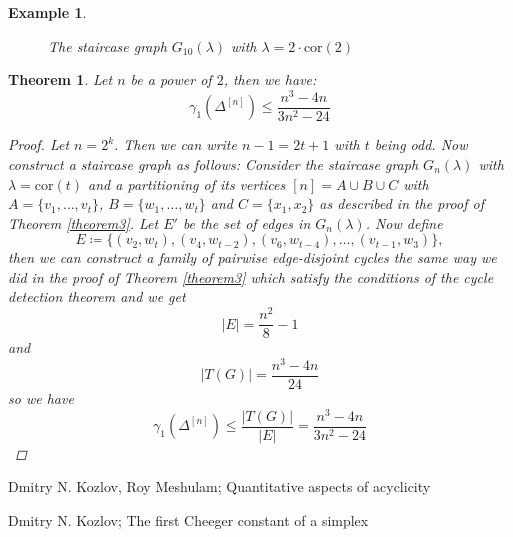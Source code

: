 \documentclass{article}
\newtheorem{thm}{Theorem}[section]
\newtheorem{expl}{Example}[section]
\begin{document}
\begin{expl}
\begin{figure}[ht]
  \caption{The staircase graph $G_{10}(\lambda)$ with $\lambda=2\cdot\text{cor}(2)$}
  \label{figure1:Figure 1}
\end{figure}
\end{expl}

\begin{thm}\label{theorem4}
Let $n$ be a power of $2$, then we have:
\[
\gamma_1(\Delta^{[n]})\leq\frac{n^3-4n}{3n^2-24}
\]
\begin{proof}
Let $n=2^k$. Then we can write $n-1=2t+1$ with $t$ being odd. Now construct a staircase graph as follows:
Consider the staircase graph $G_n(\lambda)$ with $\lambda=\text{cor}(t)$ and a partitioning of its vertices $[n]=A\cup B\cup C$ with $A=\{v_1,\ldots,v_t\}$, $B=\{w_1,\ldots,w_t\}$ and $C=\{x_1,x_2\}$ as described in the proof of Theorem \ref{theorem3}. Let $E'$ be the set of edges in $G_n(\lambda)$. Now define
\[
E\coloneqq\{(v_2,w_t),(v_4,w_{t-2}),(v_6,w_{t-4}),\ldots,(v_{t-1},w_3)\},
\]
then we can construct a family of pairwise edge-disjoint cycles the same way we did in the proof of Theorem \ref{theorem3} which satisfy the conditions of the cycle detection theorem and we get
\[
|E|=\frac{n^2}{8}-1
\]
and
\[
|T(G)|=\frac{n^3-4n}{24}
\]
so we have
\[
\gamma_1(\Delta^{[n]})\leq\frac{|T(G)|}{|E|}=\frac{n^3-4n}{3n^2-24}
\]
\end{proof}
\end{thm}

\begin{thebibliography}{9}

 Dmitry N. Kozlov, Roy Meshulam; Quantitative aspects of acyclicity

 Dmitry N. Kozlov; The first Cheeger constant of a simplex

\end{thebibliography}
\end{document}
